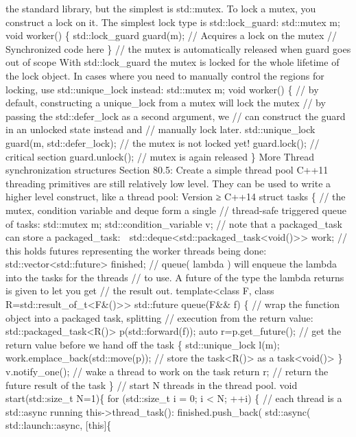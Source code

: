 the standard library, but the simplest is std::mutex. To lock a mutex,
you construct a lock on it. The simplest lock type is std::lock\_guard:
std::mutex m; void worker() \{ std::lock\_guard guard(m); // Acquires a
lock on the mutex // Synchronized code here \} // the mutex is
automatically released when guard goes out of scope With
std::lock\_guard the mutex is locked for the whole lifetime of the lock
object. In cases where you need to manually control the regions for
locking, use std::unique\_lock instead: std::mutex m; void worker() \{
// by default, constructing a unique\_lock from a mutex will lock the
mutex // by passing the std::defer\_lock as a second argument, we // can
construct the guard in an unlocked state instead and // manually lock
later. std::unique\_lock guard(m, std::defer\_lock); // the mutex is not
locked yet! guard.lock(); // critical section guard.unlock(); // mutex
is again released \} More Thread synchronization structures Section
80.5: Create a simple thread pool C++11 threading primitives are still
relatively low level. They can be used to write a higher level
construct, like a thread pool: Version ≥ C++14 struct tasks \{ // the
mutex, condition variable and deque form a single // thread-safe
triggered queue of tasks: std::mutex m; std::condition\_variable v; //
note that a packaged\_task can store a packaged\_task: 
std::deque\textless std::packaged\_task\textless void()\textgreater\textgreater{}
work; // this holds futures representing the worker threads being done:
std::vector\textless std::future\textgreater{} finished; // queue(
lambda ) will enqueue the lambda into the tasks for the threads // to
use. A future of the type the lambda returns is given to let you get //
the result out. template\textless class F, class
R=std::result\_of\_t\textless F\&()\textgreater\textgreater{}
std::future queue(F\&\& f) \{ // wrap the function object into a
packaged task, splitting // execution from the return value:
std::packaged\_task\textless R()\textgreater{} p(std::forward(f)); auto
r=p.get\_future(); // get the return value before we hand off the task
\{ std::unique\_lock l(m); work.emplace\_back(std::move(p)); // store
the task\textless R()\textgreater{} as a
task\textless void()\textgreater{} \} v.notify\_one(); // wake a thread
to work on the task return r; // return the future result of the task \}
// start N threads in the thread pool. void start(std::size\_t N=1)\{
for (std::size\_t i = 0; i \textless{} N; ++i) \{ // each thread is a
std::async running this-\textgreater thread\_task():
finished.push\_back( std::async( std::launch::async, {[}this{]}\{
